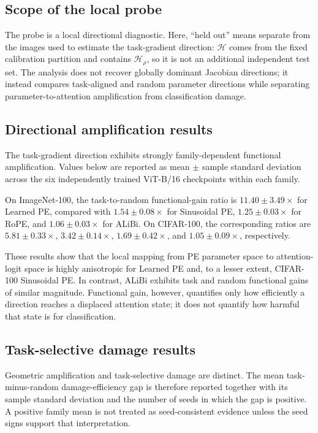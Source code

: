 \documentclass[preprint,12pt,authoryear]{elsarticle}
\begin{document}
\subsection{Scope of the local probe}

The probe is a local directional diagnostic. Here, ``held out'' means
separate from the images used to estimate the task-gradient direction:
$\mathcal{H}$ comes from the fixed calibration partition and contains
$\mathcal{H}_{\rho}$, so it is not an additional independent test set.
The analysis does not recover globally dominant Jacobian directions; it
instead compares task-aligned and random parameter directions while
separating parameter-to-attention amplification from classification damage.


\subsection{Directional amplification results}

The task-gradient direction exhibits strongly family-dependent
functional amplification. Values below are reported as mean $\pm$
sample standard deviation across the six independently trained ViT-B/16
checkpoints within each family.

On ImageNet-100, the task-to-random functional-gain ratio is
$11.40\pm3.49\times$ for Learned PE, compared with
$1.54\pm0.08\times$ for Sinusoidal PE,
$1.25\pm0.03\times$ for RoPE, and
$1.06\pm0.03\times$ for ALiBi. On CIFAR-100, the corresponding ratios
are $5.81\pm0.33\times$, $3.42\pm0.14\times$,
$1.69\pm0.42\times$, and $1.05\pm0.09\times$, respectively.

These results show that the local mapping from PE parameter space to
attention-logit space is highly anisotropic for Learned PE and, to a
lesser extent, CIFAR-100 Sinusoidal PE. In contrast, ALiBi exhibits
task and random functional gains of similar magnitude. Functional
gain, however, quantifies only how efficiently a direction reaches a
displaced attention state; it does not quantify how harmful that state
is for classification.

\subsection{Task-selective damage results}

Geometric amplification and task-selective damage are distinct. The
mean task-minus-random damage-efficiency gap is therefore reported
together with its sample standard deviation and the number of seeds in
which the gap is positive. A positive family mean is not treated as
seed-consistent evidence unless the seed signs support that
interpretation.
\end{document}
